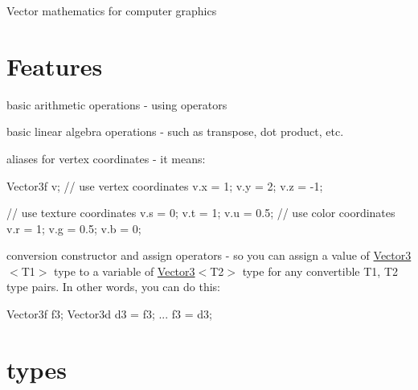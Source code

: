 Vector mathematics for computer graphics \hypertarget{main_Features}{}\section{Features}\label{main_Features}

\begin{DoxyItemize}
\item basic arithmetic operations -\/ using operators  
\item basic linear algebra operations -\/ such as transpose, dot product, etc.  
\item aliases for vertex coordinates -\/ it means: 
\begin{DoxyPre}
  Vector3f v;
  // use vertex coordinates
  v.x = 1; v.y = 2; v.z = -1;\end{DoxyPre}



\begin{DoxyPre}  // use texture coordinates
  v.s = 0; v.t = 1; v.u = 0.5;
  // use color coordinates
  v.r = 1; v.g = 0.5; v.b = 0;
    \end{DoxyPre}
  
\item conversion constructor and assign operators -\/ so you can assign a value of \hyperlink{class_vector3}{Vector3}$<$T1$>$ type to a variable of \hyperlink{class_vector3}{Vector3}$<$T2$>$ type for any convertible T1, T2 type pairs. In other words, you can do this: 
\begin{DoxyPre}\end{DoxyPre}



\begin{DoxyPre}  Vector3f f3; Vector3d d3 = f3;
  ...
  f3 = d3;
    \end{DoxyPre}
  
\end{DoxyItemize}\hypertarget{main_Predefined}{}\section{types}\label{main_Predefined}

